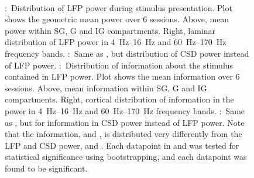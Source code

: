 \begin{figure}[htbp]%
    \centering
    \hspace*{\fill}
    \hspace*{\fill}\hspace{.2cm}\hspace*{\fill}
    \hspace*{\fill}
    \\
    \hspace*{\fill}
    \hspace*{\fill}\hspace{.2cm}\hspace*{\fill}
    \hspace*{\fill}
    \caption{
\protect{}:~Distribution of \ac{LFP} power during stimulus presentation.
Plot shows the geometric mean power over \num{6} sessions.
Above, mean power within \ac{SG}, \ac{G} and \ac{IG} compartments.
Right, laminar distribution of \ac{LFP} power in \SIrange{4}{16}{Hz} and \SIrange{60}{170}{Hz} frequency bands.
\protect{}:~Same as \protect{}, but distribution of \ac{CSD} power instead of \ac{LFP} power.
\protect{}:~Distribution of information about the stimulus contained in \ac{LFP} power.
Plot shows the mean information over \num{6} sessions.
Above, mean information within \ac{SG}, \ac{G} and \ac{IG} compartments.
Right, cortical distribution of information in the power in \SIrange{4}{16}{Hz} and \SIrange{60}{170}{Hz} frequency bands.
\protect{}:~Same as \protect{}, but for information in \ac{CSD} power instead of \ac{LFP} power.
Note that the information, \protect{} and \protect{}, is distributed very differently from the \ac{LFP} and \ac{CSD} power, \protect{} and \protect{}.
Each datapoint in \protect{} and \protect{} was tested for statistical significance using bootstrapping, and each datapoint was found to be significant.
    \label{fig:lam_info}
}
\end{figure}

